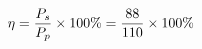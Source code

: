 \documentclass[preview]{standalone}
\begin{document}
\begin{align*}
\special{dvisvgm:raw <g id='unique000'>}\eta=\frac{P_s}{P_p}\times100\%=\frac{88}{110}\times100\%\special{dvisvgm:raw </g>}
\end{align*}
\end{document}
